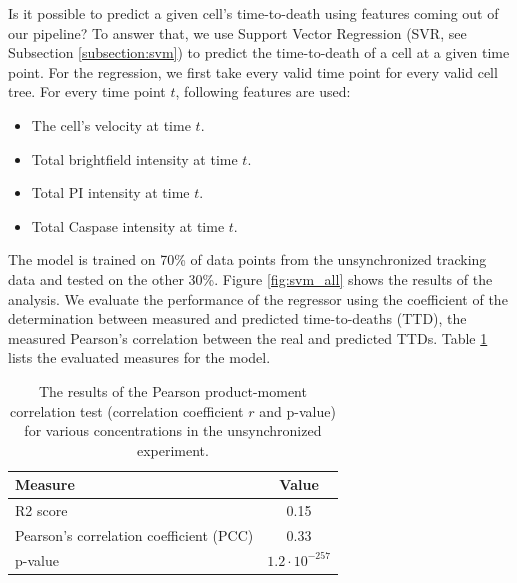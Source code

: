 \documentclass[pdftex,12pt,a4paper]{report}
\begin{document}
Is it possible to predict a given cell's time-to-death using features coming out of our pipeline? To answer that, we use Support Vector Regression (SVR, see Subsection \ref{subsection:svm}) to predict the time-to-death of a cell at a given time point. For the regression, we first take every valid time point for every valid cell tree. For every time point $t$, following features are used:

\begin{itemize}
\item The cell's velocity at time $t$.
\item Total brightfield intensity at time $t$.
\item Total PI intensity at time $t$.
\item Total Caspase intensity at time $t$.
\end{itemize}

The model is trained on 70\% of data points from the unsynchronized tracking data and tested on the other 30\%. Figure \ref{fig:svm_all} shows the results of the analysis. We evaluate the performance of the regressor using the coefficient of the determination between measured and predicted time-to-deaths (TTD), the measured Pearson's correlation between the real and predicted TTDs. Table \ref{table:unsyn_ttd_r_p} lists the evaluated measures for the model.

\begin{table}[H]
\centering
\begin{tabular}{ l | c }
\hline
Measure & Value \\
\hline\hline
R2 score & 0.15 \\
\hline
Pearson's correlation coefficient (PCC) & 0.33 \\
p-value & $1.2 \cdot 10^{-257}$ \\
\hline
\end{tabular}
\caption{The results of the Pearson product-moment correlation test (correlation coefficient $r$ and p-value) for various concentrations in the unsynchronized experiment.}
\label{table:unsyn_ttd_r_p}
\end{table}


\end{document}
